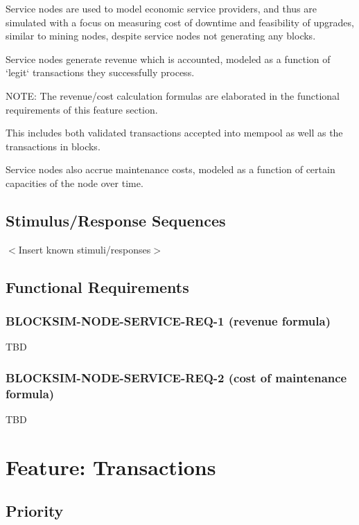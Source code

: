 \documentclass{scrreprt}
\begin{document}
Service nodes are used to model economic service providers, and thus
are simulated with a focus on measuring cost of downtime and feasibility
of upgrades, similar to mining nodes, despite service nodes not generating
any blocks.

Service nodes generate revenue which is accounted, modeled as a function of
`legit` transactions they successfully process.

NOTE: The revenue/cost calculation formulas are elaborated in the functional
requirements of this feature section.

This includes both validated transactions accepted into mempool as well as
the transactions in blocks.

Service nodes also accrue maintenance costs, modeled as a function of certain
capacities of the node over time.


\subsection{Stimulus/Response Sequences}

$<$Insert known stimuli/responses$>$


\subsection{Functional Requirements}

\subsubsection{BLOCKSIM-NODE-SERVICE-REQ-1 (revenue formula)}

TBD


\subsubsection{BLOCKSIM-NODE-SERVICE-REQ-2 (cost of maintenance formula)}

TBD







\section{Feature: Transactions}

\subsection{Priority}
\end{document}
